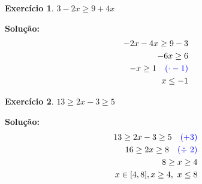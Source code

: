 \documentclass[12pt]{article}
\newtheorem{exercicio}{Exercício}
\begin{document}
\hrulefill{}

\begin{exercicio}
\( 3-2x \geq 9+4x \)
\end{exercicio}

\textbf{Solução:}
\setcounter{equation}{0}
\begin{align}
-2x-4x \geq 9-3 \\
-6x \geq 6 \\
-x \geq 1 \quad \textcolor{blue}{(\cdot -1)}\\
x \leq -1
\end{align}

\hrulefill{}

\begin{exercicio}
\(13 \geq 2x-3 \geq 5\)
\end{exercicio}

\textbf{Solução:}
\setcounter{equation}{0}
\begin{align}
13 \geq 2x-3 \geq 5 \quad \textcolor{blue}{(+ 3)}\\
16 \geq 2x \geq 8 \quad \textcolor{blue}{(\div\ 2)}\\
8 \geq x \geq 4 \\
x \in [4,8], x \ge 4,\ x \le 8
\end{align}

\hrulefill{}
\end{document}
